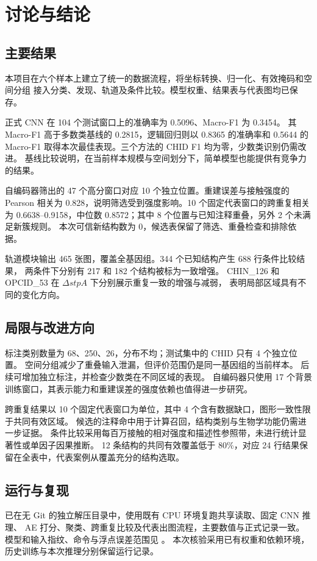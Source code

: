 \section{讨论与结论}
\subsection{主要结果}
本项目在六个样本上建立了统一的数据流程，将坐标转换、归一化、有效掩码和空间分组
接入分类、发现、轨道及条件比较。模型权重、结果表与代表图均已保存。

正式 CNN 在 104 个测试窗口上的准确率为 0.5096、Macro-F1 为 0.3454。
其 Macro-F1 高于多数类基线的 0.2815，逻辑回归则以 0.8365 的准确率和 0.5644 的
Macro-F1 取得本次最佳表现。三个方法的 CHID F1 均为零，少数类识别仍需改进。
基线比较说明，在当前样本规模与空间划分下，简单模型也能提供有竞争力的结果。

自编码器筛出的 47 个高分窗口对应 10 个独立位置。重建误差与接触强度的 Pearson
相关为 0.828，说明筛选受到强度影响。10 个固定代表窗口的跨重复相关为
0.6638--0.9158，中位数 0.8572；其中 8 个位置与已知注释重叠，另外 2 个未满足新簇规则。
本次可信新结构数为 0，候选表保留了筛选、重叠检查和排除依据。

轨道模块输出 465 张图，覆盖全基因组。344 个已知结构产生 688 行条件比较结果，
两条件下分别有 217 和 182 个结构被标为一致增强。
CHIN\_126 和 OPCID\_53 在 $\Delta stpA$ 下分别展示重复一致的增强与减弱，
表明局部区域具有不同的变化方向。

\subsection{局限与改进方向}
标注类别数量为 68、250、26，分布不均；测试集中的 CHID 只有 4 个独立位置。
空间分组减少了重叠输入泄漏，但评价范围仍是同一基因组的当前样本。
后续可增加独立标注，并检查少数类在不同区域的表现。
自编码器只使用 17 个背景训练窗口，其表示能力和重建误差的强度依赖也值得进一步研究。

跨重复结果以 10 个固定代表窗口为单位，其中 4 个含有数据缺口，图形一致性限于共同有效区域。
候选的注释命中用于计算召回，结构类别与生物学功能仍需进一步证据。
条件比较采用每百万接触的相对强度和描述性参照带，未进行统计显著性或单因子因果推断。
12 条结构的共同有效覆盖低于 80\%，对应 24 行结果保留在全表中，代表案例从覆盖充分的结构选取。

\subsection{运行与复现}
已在无 Git 的独立解压目录中，使用既有 CPU 环境复跑共享读取、固定 CNN 推理、
AE 打分、聚类、跨重复比较及代表出图流程，主要数值与正式记录一致。
模型和输入指纹、命令与浮点误差范围见 。
本次核验采用已有权重和依赖环境，历史训练与本次推理分别保留运行记录。

